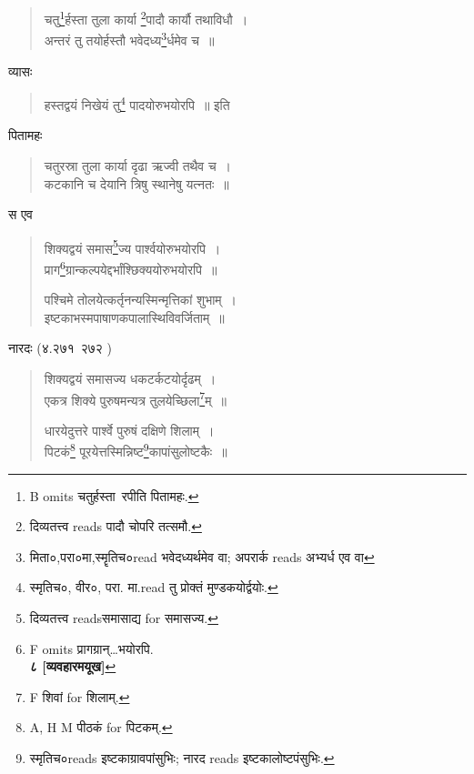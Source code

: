 \documentclass[11pt, openany]{book}
\begin{document}
\begin{quote}
{\vy चतु\renewcommand{\thefootnote}{5}\footnote{B omits चतुर्हस्ता\textendash\ रपीति पितामहः.}र्हस्ता तुला कार्या \renewcommand{\thefootnote}{6}\footnote{दिव्यतत्त्व reads {\qt पादौ चोपरि तत्समौ}.}पादौ कार्यौ तथाविधौ~।\\
अन्तरं तु तयोर्हस्तौ भवेदध्य\renewcommand{\thefootnote}{7}\footnote{मिता०,परा०मा,स्मॄतिच०read भवेदध्यर्थमेव वा; अपरार्क reads {\qt अभ्यर्ध एव वा}}र्धमेव च~॥}
\end{quote}

व्यासः

\begin{quote}
{\vy हस्तद्वयं निखेयं तु\renewcommand{\thefootnote}{8}\footnote{स्मृतिच०, वीर०, परा. मा.read {\qt तु प्रोक्तं मुण्डकयोर्द्वयोः}.} पादयोरुभयोरपि~॥} इति
\end{quote}

पितामहः

\begin{quote}
{\vy चतुरस्रा तुला कार्या दृढा ऋज्वी तथैव च~।\\
कटकानि च देयानि त्रिषु स्थानेषु यत्नतः~॥}
\end{quote}

स एव

\begin{quote}
{\vy शिक्यद्वयं समास\renewcommand{\thefootnote}{9}\footnote{दिव्यतत्त्व readsसमासाद्य for समासज्य.}ज्य पार्श्वयोरुभयोरपि~।\\
प्राग\renewcommand{\thefootnote}{10}\footnote{F omits प्रागग्रान्\ldots भयोरपि. \\
\indent \textbf{८ [व्यवहारमयूख]}}ग्रान्कल्पयेद्दर्भांश्छिक्ययोरुभयोरपि~॥

पश्चिमे तोलयेत्कर्तृनन्यस्मिन्मृत्तिकां शुभाम्~।\\
इष्टकाभस्मपाषाणकपालास्थिविवर्जिताम्~॥}
\end{quote}

\newpage

नारदः (४.२७१\textendash\ २७२ ) 

\begin{quote}
{\vy शिक्यद्वयं समासज्य धकटर्कटयोर्दृढम्~।\\
एकत्र शिक्ये पुरुषमन्यत्र तुलयेच्छिला\renewcommand{\thefootnote}{1}\footnote{F शिवां for शिलाम्.}म्~॥

धारयेदुत्तरे पार्श्वे पुरुषं दक्षिणे शिलाम्~।\\
पिटकं\renewcommand{\thefootnote}{2}\footnote{A, H M पीठकं for पिटकम्.} पूरयेत्तस्मिन्निष्ट\renewcommand{\thefootnote}{3}\footnote{स्मृतिच०reads इष्टकाग्रावपांसुभिः; नारद reads इष्टकालोष्टपंसुभिः.}कापांसुलोष्टकैः~॥}
\end{quote}
\end{document}
